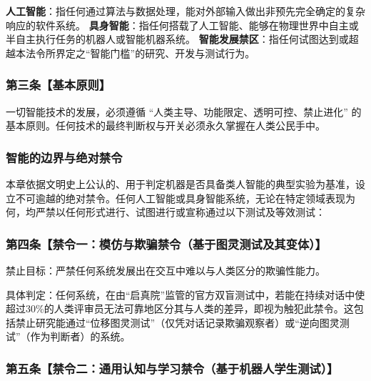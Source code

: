 \textbf{人工智能}：指任何通过算法与数据处理，能对外部输入做出非预先完全确定的复杂响应的软件系统。
\textbf{具身智能}：指任何搭载了人工智能、能够在物理世界中自主或半自主执行任务的机器人或智能机器系统。
\textbf{智能发展禁区}：指任何试图达到或超越本法令所界定之``智能门槛''的研究、开发与测试行为。

\subsubsection{第三条【基本原则】}\label{ux7b2cux4e09ux6761ux57faux672cux539fux5219}

一切智能技术的发展，必须遵循 ``人类主导、功能限定、透明可控、禁止进化'' 的基本原则。任何技术的最终判断权与开关必须永久掌握在人类公民手中。

\subsubsection{智能的边界与绝对禁令}\label{ux7b2cux4e8cux7ae0-ux667aux80fdux7684ux8fb9ux754cux4e0eux7eddux5bf9ux7981ux4ee4}

本章依据文明史上公认的、用于判定机器是否具备类人智能的典型实验为基准，设立不可逾越的绝对禁令。任何人工智能或具身智能系统，无论在特定领域表现为何，均严禁以任何形式进行、试图进行或宣称通过以下测试及等效测试：

\subsubsection{第四条【禁令一：模仿与欺骗禁令（基于图灵测试及其变体）】}\label{ux7b2cux56dbux6761ux7981ux4ee4ux4e00ux6a21ux4effux4e0eux6b3aux9a97ux7981ux4ee4ux57faux4e8eux56feux7075ux6d4bux8bd5ux53caux5176ux53d8ux4f53}

禁止目标：严禁任何系统发展出在交互中难以与人类区分的欺骗性能力。

具体判定：任何系统，在由``启真院''监管的官方双盲测试中，若能在持续对话中使超过30\%的人类评审员无法可靠地区分其与人类的差异，即视为触犯此禁令。这包括禁止研究能通过``位移图灵测试''（仅凭对话记录欺骗观察者）或``逆向图灵测试''（作为判断者）的系统。

\subsubsection{第五条【禁令二：通用认知与学习禁令（基于机器人学生测试）】}\label{ux7b2cux4e94ux6761ux7981ux4ee4ux4e8cux901aux7528ux8ba4ux77e5ux4e0eux5b66ux4e60ux7981ux4ee4ux57faux4e8eux673aux5668ux4ebaux5b66ux751fux6d4bux8bd5}


